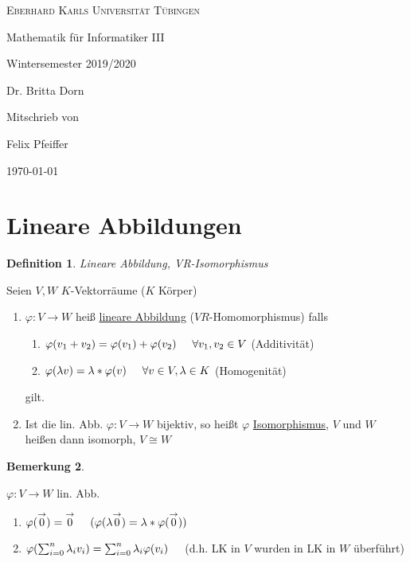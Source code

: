 \documentclass[a4paper,11pt]{article}
\newtheorem{definition}{Definition}[section]
\newtheorem{bem}[definition]{Bemerkung}
\newcommand{\zerovec}{\overset{\rightarrow}{0}}
\newcommand{\hsp}{\hspace{5mm}}
\begin{document}

\begin{titlepage}
	\centering
	{\scshape\LARGE Eberhard Karls Universität Tübingen \par}
	\vspace{2.5cm}
	{\huge Mathematik für Informatiker III\par}
	\vspace{1.5cm}
	{\Large Wintersemester 2019/2020\par}
	\vspace{1.5cm}
	{\Large Dr. Britta Dorn\par}
	\vspace{4cm}
	{\Large\itshape \par}
	Mitschrieb von\par
	Felix Pfeiffer
	\vfill

	{\large \today\par}
\end{titlepage}

\newpage
{}

\tableofcontents

\newpage
{}
\section{Lineare Abbildungen}
\begin{definition}
Lineare Abbildung, VR-Isomorphismus
\end{definition}
Seien $V,W$ $K$-Vektorräume ($K$ Körper)
\begin{enumerate}[label=\alph*)]
\item $\varphi\colon V\rightarrow W$ heiß \underline{lineare Abbildung} ($VR$-Homomorphismus) falls
	\begin{enumerate}[label=(\roman*)]
	\item $\varphi(v_1+v_2)=\varphi(v_1)+\varphi(v_2)\hsp\forall v_1,v_2\in V$ (Additivität)
	\item $\varphi(\lambda v)=\lambda*\varphi(v)\hsp\forall v\in V,\lambda\in K$ (Homogenität)
	\end{enumerate}
	gilt.
	\item Ist die lin. Abb. $\varphi\colon V\rightarrow W$ bijektiv, so heißt $\varphi$ \underline{Isomorphismus}, $V$ und $W$ heißen dann isomorph, $V\cong W$
\end{enumerate}

\begin{bem}
\end{bem}
$\varphi\colon V\rightarrow W$ lin. Abb.
\begin{enumerate}[label=\alph*)]
	\item $\varphi(\zerovec)=\zerovec\hsp(\varphi(\lambda\zerovec)=\lambda*\varphi(\zerovec))$
	\item $\varphi(\sum_{i=0}^n\lambda_iv_i)=\sum_{i=0}^n\lambda_i\varphi(v_i)\hsp$(d.h. LK in $V$ wurden in LK in $W$ überführt)
\end{enumerate}
\end{document}
